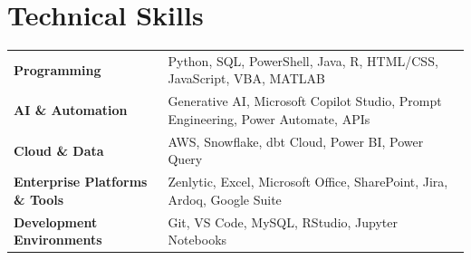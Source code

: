 \documentclass[a4paper,10pt]{article}
\begin{document}

\section{Technical Skills}

\begin{tabularx}{\linewidth}{@{}l X@{}}

\textbf{Programming} &
\normalsize{Python, SQL, PowerShell, Java, R, HTML/CSS, JavaScript, VBA, MATLAB}
\\[3pt]

\textbf{AI \& Automation} &
\normalsize{Generative AI, Microsoft Copilot Studio, Prompt Engineering, Power Automate, APIs}
\\[3pt]

\textbf{Cloud \& Data} &
\normalsize{AWS, Snowflake, dbt Cloud, Power BI, Power Query}
\\[3pt]

\textbf{Enterprise Platforms \& Tools} &
\normalsize{Zenlytic, Excel, Microsoft Office, SharePoint, Jira, Ardoq, Google Suite}
\\[3pt]

\textbf{Development Environments} &
\normalsize{Git, VS Code, MySQL, RStudio, Jupyter Notebooks}

\end{tabularx}

\vfill
{}
\end{document}
